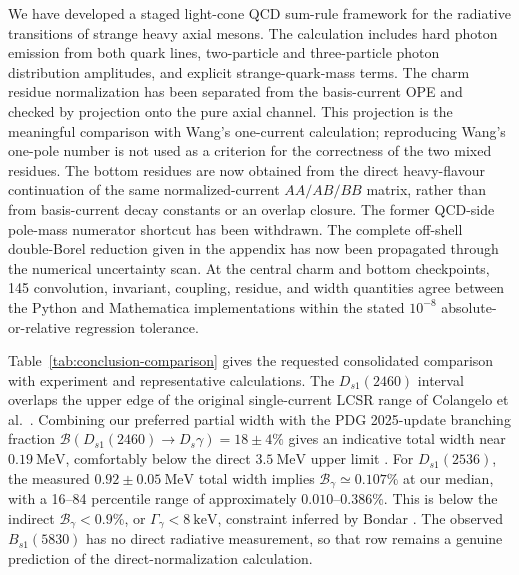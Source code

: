 \documentclass[11pt]{article}
\newcommand{\Ds}{D_s}
\newcommand{\Dsone}{D_{s1}}
\newcommand{\Bsone}{B_{s1}}
\newcommand{\MeV}{\mathrm{MeV}}
\newcommand{\keV}{\mathrm{keV}}
\begin{document}
We have developed a staged light-cone QCD sum-rule framework for the radiative
transitions of strange heavy axial mesons.  The calculation includes hard photon
emission from both quark lines, two-particle and three-particle photon
distribution amplitudes, and explicit strange-quark-mass terms.  The charm
residue normalization has been separated from the basis-current OPE and checked
by projection onto the pure axial channel.  This projection is the meaningful
comparison with Wang's one-current calculation; reproducing Wang's one-pole
number is not used as a criterion for the correctness of the two mixed
residues.  The bottom residues are now obtained from the direct heavy-flavour
continuation of the same normalized-current $AA/AB/BB$ matrix, rather than
from basis-current decay constants or an overlap closure.
The former QCD-side pole-mass numerator shortcut has been withdrawn.  The
complete off-shell double-Borel reduction given in the appendix has now been
propagated through the numerical uncertainty scan.  At the central charm and
bottom checkpoints, 145 convolution, invariant, coupling, residue, and width
quantities agree between the Python and Mathematica implementations within the
stated $10^{-8}$ absolute-or-relative regression tolerance.

Table~\ref{tab:conclusion-comparison} gives the requested consolidated
comparison with experiment and representative calculations.  The
$\Dsone(2460)$ interval overlaps the upper edge of the original single-current
LCSR range of Colangelo et al.\ \cite{Colangelo2005}.  Combining our preferred partial width
with the PDG 2025-update branching fraction
$\mathcal B(\Dsone(2460)\to\Ds\gamma)=18\pm4\%$ gives an indicative total width
near $0.19~\MeV$, comfortably below the direct $3.5~\MeV$ upper limit
\cite{PDG2025Update}.  For $\Dsone(2536)$, the measured
$0.92\pm0.05~\MeV$ total width implies
$\mathcal B_\gamma\simeq0.107\%$ at our median, with a 16--84 percentile range
of approximately $0.010$--$0.386\%$.  This is below the indirect
$\mathcal B_\gamma<0.9\%$, or $\Gamma_\gamma<8~\keV$, constraint inferred by
Bondar \cite{Bondar2025Why}.  The observed $\Bsone(5830)$ has no direct
radiative measurement, so that row remains a genuine prediction of the
direct-normalization calculation.
\end{document}
